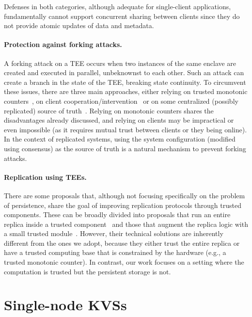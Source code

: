 Defenses in both categories, although adequate for single-client
applications, fundamentally cannot support concurrent sharing
between clients since they do not provide atomic updates of data
and metadata.

\paragraph{Protection against forking attacks.}
A forking attack on a TEE occurs when two instances of the same
enclave are created and executed in parallel, unbeknownst to each
other. Such an attack can create a branch in the state of the
TEE, breaking state continuity. To circumvent these issues, there
are three main approaches, either relying on trusted monotonic
counters~\cite{rote,ariadne,a2m,trinc,memoir},  on client
cooperation/intervention~\cite{fork_verify,fork_fail,fork_comm,fork_lcm,fork_sporc,fork_fs,fork_venus}
or  on some centralized (possibly replicated) source of
truth~\cite{haven}. Relying on monotonic counters shares the
disadvantages already discussed, and relying on clients may be
impractical or even impossible (as it requires mutual trust
between clients or they being online). In the context of
replicated systems, using the system configuration (modified
using consensus) as the source of truth is a natural mechanism to
prevent forking attacks.

\paragraph{Replication using \acp{TEE}.}
There are some proposals that, although not focusing specifically
on the problem of persistence, share the goal of improving replication
protocols through trusted components. These can be broadly divided into
proposals that run an entire replica inside a trusted
component~\cite{p2p-sgx,bft-sgx} and those that augment the replica logic with a
small trusted module~\cite{a2m,trinc}.  However, their technical solutions are
inherently different from the ones we adopt, because they either
trust the entire replica or have a trusted computing base that is
constrained by the hardware (e.g., a trusted monotonic counter).
In contrast, our work focuses on a setting where the computation is
trusted but the persistent storage is not.

\section{Single-node \acfp{KVS}}

